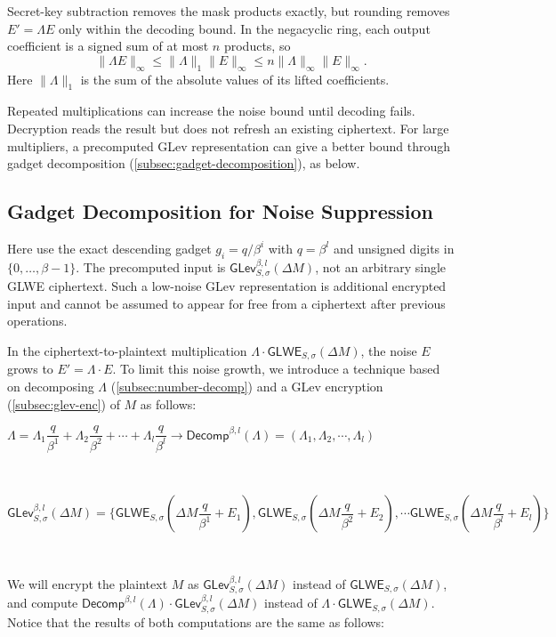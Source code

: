 Secret-key subtraction removes the mask products exactly, but rounding removes $E'=\Lambda E$ only within the decoding bound. In the negacyclic ring, each output coefficient is a signed sum of at most $n$ products, so
\[
\|\Lambda E\|_\infty\le\|\Lambda\|_1\|E\|_\infty\le n\|\Lambda\|_\infty\|E\|_\infty.
\]
Here $\|\Lambda\|_1$ is the sum of the absolute values of its lifted coefficients.

Repeated multiplications can increase the noise bound until decoding fails. Decryption reads the result but does not refresh an existing ciphertext. For large multipliers, a precomputed GLev representation can give a better bound through gadget decomposition (\autoref{subsec:gadget-decomposition}), as below.

\subsection{Gadget Decomposition for Noise Suppression}
\label{subsubsec:gadget-decomposition-noise-suppression}

Here use the exact descending gadget $g_i=q/\beta^i$ with $q=\beta^l$ and unsigned digits in $\{0,\ldots,\beta-1\}$. The precomputed input is $\textsf{GLev}^{\beta,l}_{S,\sigma}(\Delta M)$, not an arbitrary single GLWE ciphertext. Such a low-noise GLev representation is additional encrypted input and cannot be assumed to appear for free from a ciphertext after previous operations.

In the ciphertext-to-plaintext multiplication $\Lambda \cdot \textsf{GLWE}_{S, \sigma}(\Delta M)$, the noise $E$ grows to $E' = \Lambda \cdot E$. To limit this noise growth, we introduce a technique based on decomposing $\Lambda$ (\autoref{subsec:number-decomp}) and a GLev encryption (\autoref{subsec:glev-enc}) of $M$ as follows:


$\Lambda = \Lambda_1 \dfrac{q}{\beta^1} + \Lambda_2 \dfrac{q}{\beta^2} + \cdots + \Lambda_l \dfrac{q}{\beta^l} \longrightarrow \textsf{Decomp}^{\beta, l}(\Lambda) = (\Lambda_1, \Lambda_2, \cdots, \Lambda_l)$

$ $

$\textsf{GLev}_{S, \sigma}^{\beta, l}(\Delta M) = \Bigg\{ \textsf{GLWE}_{S, \sigma}\left(\Delta M \dfrac{q}{\beta^1} + E_1\right), \textsf{GLWE}_{S, \sigma}\left(\Delta M \dfrac{q}{\beta^2} + E_2\right), \cdots \textsf{GLWE}_{S, \sigma}\left(\Delta M \dfrac{q}{\beta^l} + E_l\right) \Bigg\}$

$ $


We will encrypt the plaintext $M$ as $\textsf{GLev}_{S, \sigma}^{\beta, l}(\Delta M)$ instead of $\textsf{GLWE}_{S, \sigma}(\Delta M)$, and compute $\textsf{Decomp}^{\beta, l}(\Lambda) \cdot \textsf{GLev}_{S, \sigma}^{\beta, l}(\Delta M)$ instead of $\Lambda \cdot \textsf{GLWE}_{S, \sigma}(\Delta M)$. Notice that the results of both computations are the same as follows:

